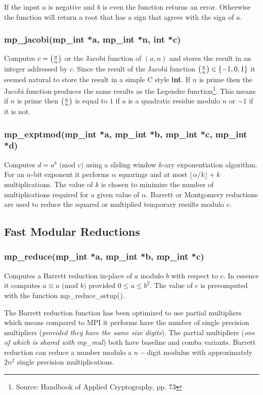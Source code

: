 \documentclass{article}
\begin{document}
If the input $a$ is negative and $b$ is even the function returns an error.  Otherwise the function will return a root
that has a sign that agrees with the sign of $a$.

\subsubsection{mp\_jacobi(mp\_int *a, mp\_int *n, int *c)}
Computes $c = \left ( {a \over n} \right )$ or the Jacobi function of $(a, n)$ and stores the result in an integer addressed
by $c$.  Since the result of the Jacobi function $\left ( {a \over n} \right ) \in \lbrace -1, 0, 1 \rbrace$ it seemed
natural to store the result in a simple C style \textbf{int}.  If $n$ is prime then the Jacobi function produces
the same results as the Legendre function\footnote{Source: Handbook of Applied Cryptography, pp. 73}.  This means if
$n$ is prime then $\left ( {a \over n} \right )$ is equal to $1$ if $a$ is a quadratic residue modulo $n$ or $-1$ if 
it is not.

\subsubsection{mp\_exptmod(mp\_int *a, mp\_int *b, mp\_int *c, mp\_int *d)}
Computes $d = a^b \mbox{ (mod }c\mbox{)}$ using a sliding window $k$-ary exponentiation algorithm.  For an $\alpha$-bit
exponent it performs $\alpha$ squarings and at most $\lfloor \alpha/k \rfloor + k$ multiplications.  The value of $k$ is
chosen to minimize the number of multiplications required for a given value of $\alpha$.  Barrett or Montgomery 
reductions are used to reduce the squared or multiplied temporary results modulo $c$.

\subsection{Fast Modular Reductions}

\subsubsection{mp\_reduce(mp\_int *a, mp\_int *b, mp\_int *c)}
Computes a Barrett reduction in-place of $a$ modulo $b$ with respect to $c$.  In essence it computes 
$a \equiv a \mbox{ (mod }b\mbox{)}$ provided $0 \le a \le b^2$.  The value of $c$ is precomputed with the 
function mp\_reduce\_setup().

The Barrett reduction function has been optimized to use partial multipliers which means compared to MPI it performs
have the number of single precision multipliers (\textit{provided they have the same size digits}).  The partial
multipliers (\textit{one of which is shared with mp\_mul}) both have baseline and comba variants.  Barrett reduction 
can reduce a number modulo a $n-$digit modulus with approximately $2n^2$ single precision multiplications.  
\end{document}
